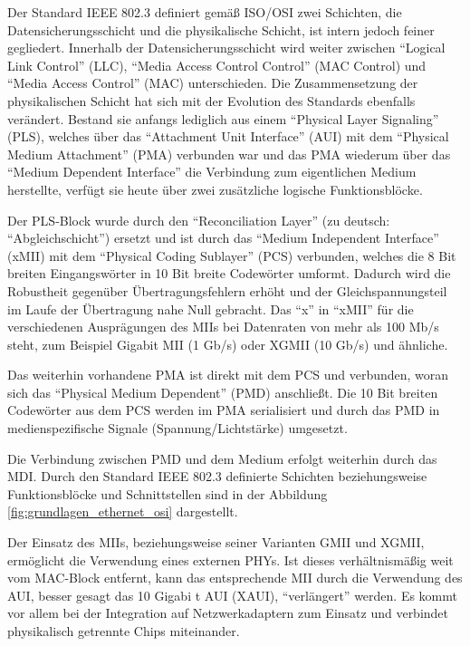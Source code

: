 \label{sec:grundlagen_ethernet_funktionsweise_interneraufbau}
Der Standard IEEE 802.3 definiert gemäß ISO/OSI zwei Schichten, die
Datensicherungsschicht und die physikalische Schicht, ist intern
jedoch feiner gegliedert. Innerhalb der Datensicherungsschicht wird
weiter zwischen ``Logical Link Control'' (LLC), ``Media Access Control
Control'' (MAC Control) und ``Media Access Control'' (MAC)
unterschieden. Die Zusammensetzung der physikalischen Schicht hat sich
mit der Evolution des Standards ebenfalls verändert. Bestand sie
anfangs lediglich aus einem ``Physical Layer Signaling'' (PLS),
welches über das ``Attachment Unit Interface'' (AUI) mit dem
``Physical Medium Attachment'' (PMA) verbunden war und das PMA
wiederum über das ``Medium Dependent Interface'' die Verbindung zum
eigentlichen Medium herstellte, verfügt sie heute über zwei zusätzliche
logische Funktionsblöcke.

Der PLS-Block wurde durch den
``Reconciliation Layer'' (zu deutsch: ``Abgleichschicht'') ersetzt und
ist durch das ``Medium Independent Interface'' (xMII) mit dem
``Physical Coding Sublayer'' (PCS) verbunden, welches die 8 Bit breiten Eingangswörter in 10 Bit breite Codewörter umformt. Dadurch wird die Robustheit gegenüber Übertragungsfehlern erhöht und der Gleichspannungsteil im Laufe der Übertragung nahe Null gebracht.
Das ``x'' in ``xMII'' für die verschiedenen Ausprägungen des MIIs bei Datenraten
von mehr als 100 Mb/s steht, zum Beispiel Gigabit MII (1 Gb/s) oder
XGMII (10 Gb/s) und ähnliche. 

Das weiterhin vorhandene PMA ist direkt
mit dem PCS und verbunden, woran sich das ``Physical Medium
Dependent'' (PMD) anschließt. Die 10 Bit breiten Codewörter aus dem PCS werden im PMA serialisiert und durch das PMD in medienspezifische Signale (Spannung/Lichtstärke) umgesetzt.

Die Verbindung zwischen PMD und dem
Medium erfolgt weiterhin durch das MDI. Durch den Standard IEEE
802.3 definierte Schichten beziehungsweise Funktionsblöcke und
Schnittstellen sind in der Abbildung \ref{fig:grundlagen_ethernet_osi}
dargestellt.

Der Einsatz des MIIs, beziehungsweise seiner Varianten GMII und XGMII,
ermöglicht die Verwendung eines externen PHYs. Ist dieses
verhältnismäßig weit vom MAC-Block entfernt, kann das entsprechende
MII durch die Verwendung des AUI, besser gesagt das 10 Gigabi t AUI
(XAUI), ``verlängert'' werden. Es kommt vor allem bei der Integration
auf Netzwerkadaptern zum Einsatz und verbindet physikalisch getrennte
Chips miteinander.

